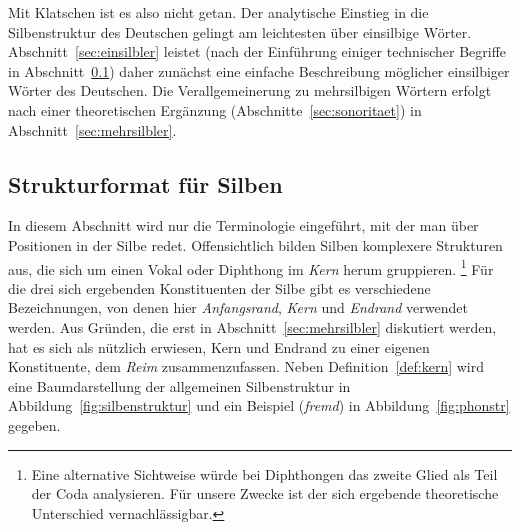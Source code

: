 
Mit Klatschen ist es also nicht getan.
Der analytische Einstieg in die Silbenstruktur des Deutschen gelingt am leichtesten über einsilbige Wörter.
Abschnitt~\ref{sec:einsilbler} leistet (nach der Einführung einiger technischer Begriffe in Abschnitt~\ref{sec:silbenstruktur}) daher zunächst eine einfache Beschreibung möglicher einsilbiger Wörter des Deutschen.
Die Verallgemeinerung zu mehrsilbigen Wörtern erfolgt nach einer theoretischen Ergänzung (Abschnitte~\ref{sec:sonoritaet}) in Abschnitt~\ref{sec:mehrsilbler}.






\subsection{Strukturformat für Silben}

\label{sec:silbenstruktur}

In diesem Abschnitt wird nur die Terminologie eingeführt, mit der man über Positionen in der Silbe redet.
Offensichtlich bilden Silben komplexere Strukturen aus, die sich um einen Vokal oder Diphthong im \textit{Kern} herum gruppieren.%
\footnote{Eine alternative Sichtweise würde bei Diphthongen das zweite Glied als Teil der Coda analysieren.
Für unsere Zwecke ist der sich ergebende theoretische Unterschied vernachlässigbar.}
Für die drei sich ergebenden Konstituenten der Silbe gibt es verschiedene Bezeichnungen, von denen hier \textit{Anfangsrand}, \textit{Kern} und \textit{Endrand} verwendet werden.
Aus Gründen, die erst in Abschnitt~\ref{sec:mehrsilbler} diskutiert werden, hat es sich als nützlich erwiesen, Kern und Endrand zu einer eigenen Konstituente, dem \textit{Reim} zusammenzufassen.
Neben Definition~\ref{def:kern} wird eine Baumdarstellung der allgemeinen Silbenstruktur in Abbildung~\ref{fig:silbenstruktur} und ein Beispiel (\textit{fremd}) in Abbildung~\ref{fig:phonstr} gegeben.


